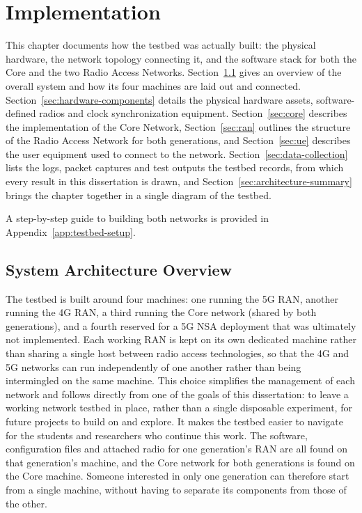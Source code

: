 %

\chapter{Implementation}
\label{cha:proposed-architecture}

This chapter documents how the testbed was actually built: the physical hardware, the network topology connecting it, and the software stack for both the Core and the two Radio Access Networks. Section~\ref{sec:system-overview} gives an overview of the overall system and how its four machines are laid out and connected. Section~\ref{sec:hardware-components} details the physical hardware assets, software-defined radios and clock synchronization equipment. Section~\ref{sec:core} describes the implementation of the Core Network, Section~\ref{sec:ran} outlines the structure of the Radio Access Network for both generations, and Section~\ref{sec:ue} describes the user equipment used to connect to the network. Section~\ref{sec:data-collection} lists the logs, packet captures and test outputs the testbed records, from which every result in this dissertation is drawn, and Section~\ref{sec:architecture-summary} brings the chapter together in a single diagram of the testbed.

A step-by-step guide to building both networks is provided in Appendix~\ref{app:testbed-setup}.

\section{System Architecture Overview}
\label{sec:system-overview}

The testbed is built around four machines: one running the 5G \gls{RAN}, another running the 4G \gls{RAN}, a third running the Core network (shared by both generations), and a fourth reserved for a 5G \gls{NSA} deployment that was ultimately not implemented. Each working \gls{RAN} is kept on its own dedicated machine rather than sharing a single host between radio access technologies, so that the 4G and 5G networks can run independently of one another rather than being intermingled on the same machine. This choice simplifies the management of each network and follows directly from one of the goals of this dissertation: to leave a working network testbed in place, rather than a single disposable experiment, for future projects to build on and explore. It makes the testbed easier to navigate for the students and researchers who continue this work. The software, configuration files and attached radio for one generation's \gls{RAN} are all found on that generation's machine, and the Core network for both generations is found on the Core machine. Someone interested in only one generation can therefore start from a single machine, without having to separate its components from those of the other.

